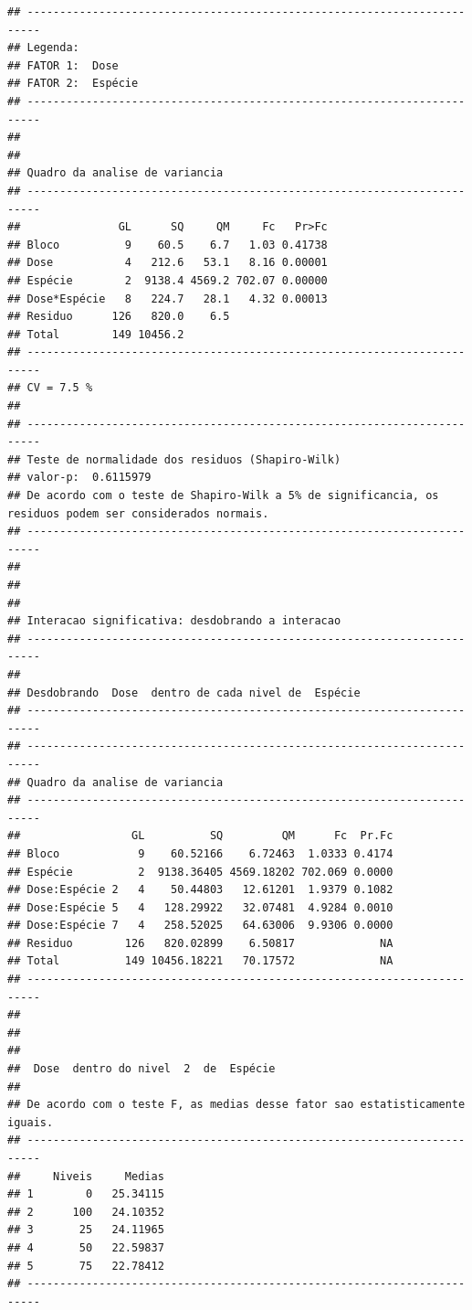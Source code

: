 \documentclass[
]{article}
\begin{document}
\begin{verbatim}
## ------------------------------------------------------------------------
## Legenda:
## FATOR 1:  Dose 
## FATOR 2:  Espécie 
## ------------------------------------------------------------------------
## 
## 
## Quadro da analise de variancia
## ------------------------------------------------------------------------
##               GL      SQ     QM     Fc   Pr>Fc
## Bloco          9    60.5    6.7   1.03 0.41738
## Dose           4   212.6   53.1   8.16 0.00001
## Espécie        2  9138.4 4569.2 702.07 0.00000
## Dose*Espécie   8   224.7   28.1   4.32 0.00013
## Residuo      126   820.0    6.5               
## Total        149 10456.2                      
## ------------------------------------------------------------------------
## CV = 7.5 %
## 
## ------------------------------------------------------------------------
## Teste de normalidade dos residuos (Shapiro-Wilk)
## valor-p:  0.6115979 
## De acordo com o teste de Shapiro-Wilk a 5% de significancia, os residuos podem ser considerados normais.
## ------------------------------------------------------------------------
## 
## 
## 
## Interacao significativa: desdobrando a interacao
## ------------------------------------------------------------------------
## 
## Desdobrando  Dose  dentro de cada nivel de  Espécie 
## ------------------------------------------------------------------------
## ------------------------------------------------------------------------
## Quadro da analise de variancia
## ------------------------------------------------------------------------
##                 GL          SQ         QM      Fc  Pr.Fc
## Bloco            9    60.52166    6.72463  1.0333 0.4174
## Espécie          2  9138.36405 4569.18202 702.069 0.0000
## Dose:Espécie 2   4    50.44803   12.61201  1.9379 0.1082
## Dose:Espécie 5   4   128.29922   32.07481  4.9284 0.0010
## Dose:Espécie 7   4   258.52025   64.63006  9.9306 0.0000
## Residuo        126   820.02899    6.50817             NA
## Total          149 10456.18221   70.17572             NA
## ------------------------------------------------------------------------
## 
## 
## 
##  Dose  dentro do nivel  2  de  Espécie 
## 
## De acordo com o teste F, as medias desse fator sao estatisticamente iguais.
## ------------------------------------------------------------------------
##     Niveis     Medias
## 1        0   25.34115
## 2      100   24.10352
## 3       25   24.11965
## 4       50   22.59837
## 5       75   22.78412
## ------------------------------------------------------------------------

\end{verbatim}
\end{document}
